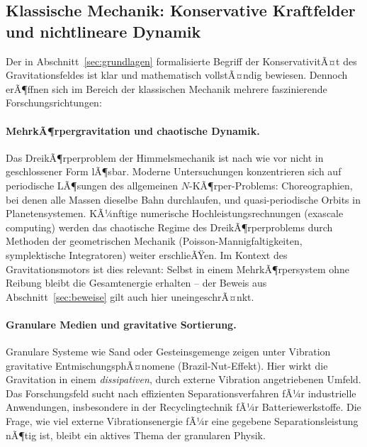 ﻿\documentclass[12pt, a4paper]{report}
\theoremstyle{definition}
\theoremstyle{remark}
\begin{document}
\subsection{Klassische Mechanik: Konservative Kraftfelder und nichtlineare
               Dynamik}

Der in Abschnitt~\ref{sec:grundlagen} formalisierte Begriff der KonservativitÃ¤t
des Gravitationsfeldes ist klar und mathematisch vollstÃ¤ndig bewiesen.
Dennoch erÃ¶ffnen sich im Bereich der klassischen Mechanik mehrere faszinierende
Forschungsrichtungen:

\paragraph{MehrkÃ¶rpergravitation und chaotische Dynamik.}
Das DreikÃ¶rperproblem der Himmelsmechanik ist nach wie vor nicht in
geschlossener Form lÃ¶sbar. Moderne Untersuchungen konzentrieren sich auf
periodische LÃ¶sungen des allgemeinen $N$-KÃ¶rper-Problems: Choreographien,
bei denen alle Massen dieselbe Bahn durchlaufen, und quasi-periodische
Orbits in Planetensystemen. KÃ¼nftige numerische Hochleistungsrechnungen
(exascale computing) werden das chaotische Regime des DreikÃ¶rperproblems
durch Methoden der geometrischen Mechanik (Poisson-Mannigfaltigkeiten,
symplektische Integratoren) weiter erschlieÃŸen. Im Kontext des
Gravitationsmotors ist dies relevant: Selbst in einem MehrkÃ¶rpersystem
ohne Reibung bleibt die Gesamtenergie erhalten -- der Beweis aus
Abschnitt~\ref{sec:beweise} gilt auch hier uneingeschrÃ¤nkt.

\paragraph{Granulare Medien und gravitative Sortierung.}
Granulare Systeme wie Sand oder Gesteinsgemenge zeigen unter Vibration
gravitative EntmischungsphÃ¤nomene (Brazil-Nut-Effekt). Hier wirkt die
Gravitation in einem \emph{dissipativen}, durch externe Vibration
angetriebenen Umfeld. Das Forschungsfeld sucht nach effizienten
Separationsverfahren fÃ¼r industrielle Anwendungen, insbesondere in der
Recyclingtechnik fÃ¼r Batteriewerkstoffe. Die Frage, wie viel externe
Vibrationsenergie fÃ¼r eine gegebene Separationsleistung nÃ¶tig ist, bleibt
ein aktives Thema der granularen Physik.
\end{document}
